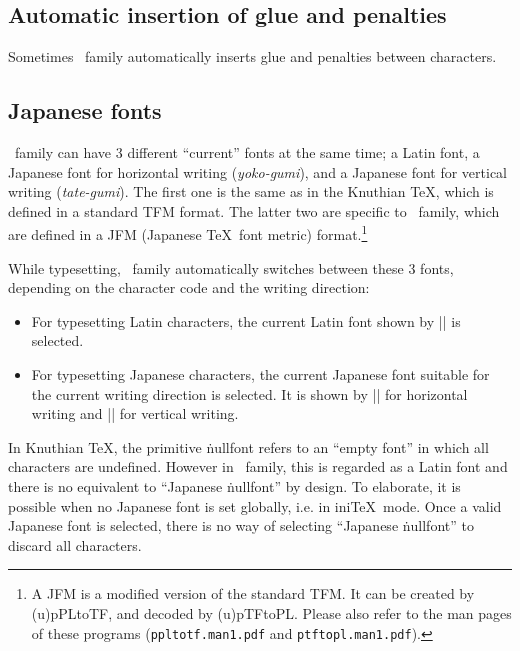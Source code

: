 \documentclass[a4paper,11pt,dvipdfmx]{article}
\let\emph=\origemph
\def\code#1{\texttt{#1}}
\def\Foreign#1{\textit{#1}}
\begin{document}
\subsection{Automatic insertion of glue and penalties}

Sometimes \pTeX\ family automatically inserts glue and penalties
between characters.

\subsection{Japanese fonts}\label{japanese-fonts}

\pTeX\ family can have 3 different ``current'' fonts at the same time;
a Latin font, a Japanese font for horizontal writing (\Foreign{yoko-gumi}),
and a Japanese font for vertical writing (\Foreign{tate-gumi}).
The first one is the same as in the Knuthian \TeX,
which is defined in a standard TFM format.
The latter two are specific to \pTeX\ family, which are defined
in a JFM (Japanese \TeX\ font metric) format.\footnote{%
A JFM is a modified version of the standard TFM.
It can be created by (u)pPLtoTF, and decoded by (u)pTFtoPL.
Please also refer to the man pages of these programs
(\code{ppltotf.man1.pdf} and \code{ptftopl.man1.pdf}).}

While typesetting, \pTeX\ family automatically switches between
these 3 fonts, depending on the character code and the writing direction:
\begin{itemize}
  \item For typesetting Latin characters,
    the current Latin font shown by |\the\font| is selected.
  \item For typesetting Japanese characters,
    the current Japanese font suitable for the current writing direction
    is selected. It is shown by |\the\jfont| for horizontal writing
    and |\the\tfont| for vertical writing.
\end{itemize}

In Knuthian \TeX, the primitive \.{nullfont} refers to an ``empty font''
in which all characters are undefined.
However in \pTeX\ family, this is regarded as a Latin font
and there is no equivalent to ``Japanese \.{nullfont}'' by design.
To elaborate, it is possible \emph{only} when no Japanese font is
set globally, i.e. in ini\TeX\ mode.
Once a valid Japanese font is selected, there is no way of
selecting ``Japanese \.{nullfont}'' to discard all characters.
\end{document}
